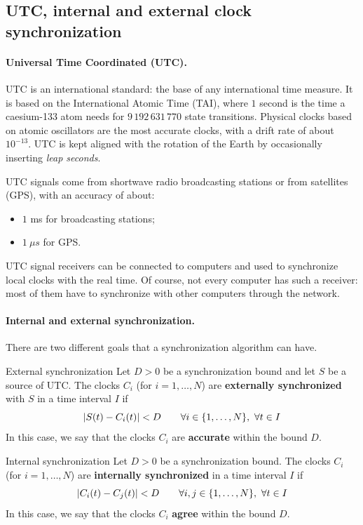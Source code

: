 \subsection{UTC, internal and external clock synchronization}

\paragraph{Universal Time Coordinated (UTC).} UTC is an international standard: the base of any international time measure. It is based on the International Atomic Time (TAI), where $1$ second is the time a caesium-133 atom needs for $9\,192\,631\,770$ state transitions. Physical clocks based on atomic oscillators are the most accurate clocks, with a drift rate of about $10^{-13}$. UTC is kept aligned with the rotation of the Earth by occasionally inserting \textit{leap seconds}.

UTC signals come from shortwave radio broadcasting stations or from satellites (GPS), with an accuracy of about:
\begin{itemize}
  \item $1$ ms for broadcasting stations;
  \item $1\ \mu s$ for GPS.
\end{itemize}
UTC signal receivers can be connected to computers and used to synchronize local clocks with the real time. Of course, not every computer has such a receiver: most of them have to synchronize with other computers through the network.

\paragraph{Internal and external synchronization.} There are two different goals that a synchronization algorithm can have.

\begin{frameddefn}{External synchronization}
  Let $D > 0$ be a synchronization bound and let $S$ be a source of UTC. The clocks $C_i$ (for $i = 1, \ldots, N$) are \textbf{externally synchronized} with $S$ in a time interval $I$ if
  \[\left\lvert S(t) - C_i(t)\right\rvert < D \qquad \forall i \in \{1, \ldots, N\},\ \forall t \in I\]
  In this case, we say that the clocks $C_i$ are \textbf{accurate} within the bound $D$.
\end{frameddefn}

\begin{frameddefn}{Internal synchronization}
  Let $D > 0$ be a synchronization bound. The clocks $C_i$ (for $i = 1, \ldots, N$) are \textbf{internally synchronized} in a time interval $I$ if
  \[\left\lvert C_i(t) - C_j(t)\right\rvert < D \qquad \forall i, j \in \{1, \ldots, N\},\ \forall t \in I\]
  In this case, we say that the clocks $C_i$ \textbf{agree} within the bound $D$.
\end{frameddefn}

